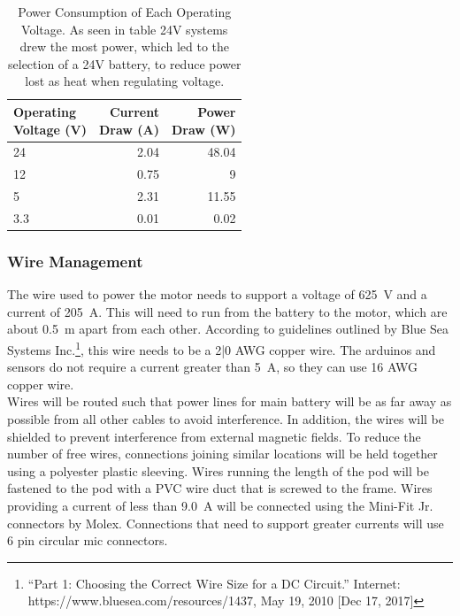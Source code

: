 \documentclass[main.tex]{subfiles}
\begin{document}
 \begin{table}[H]
        \centering
        \begin{tabular}{@{}lrr@{}} \toprule
            \makecell{Operating \\ Voltage (V)} & \makecell{Current \\ Draw (A)}  &  \makecell{Power \\ Draw (W)} \\ \midrule
            24 & 2.04 & 48.04\\
            12 & 0.75 & 9 \\
            5 & 2.31 & 11.55 \\
            3.3 & 0.01 & 0.02 \\ \bottomrule
        \end{tabular}
        \caption{Power Consumption of Each Operating Voltage. As seen in table 24V systems drew the most power, which led to the selection of a 24V battery, to reduce power lost as heat when regulating voltage.}
    \end{table}
    \subsubsection{Wire Management}
    The wire used to power the motor needs to support a voltage of \SI{625}{V} and a current of \SI{205}{A}. This will need to run from the battery to the motor, which are about \SI{0.5}{m} apart from each other. According to guidelines outlined by Blue Sea Systems Inc.\footnote{“Part 1: Choosing the Correct Wire Size for a DC Circuit.” Internet: https://www.bluesea.com/resources/1437, May 19, 2010 [Dec 17, 2017]}, this wire needs to be a 2|0 AWG copper wire. The arduinos and sensors do not require a current greater than \SI{5}{A}, so they can use 16 AWG copper wire.\\

    Wires will be routed such that power lines for main battery will be as far away as possible from all other cables to avoid interference. In addition, the wires will be shielded to prevent interference from external magnetic fields. To reduce the number of free wires, connections joining similar locations will be held together using a polyester plastic sleeving. Wires running the length of the pod will be fastened to the pod with a PVC wire duct that is screwed to the frame. Wires providing a current of less than \SI{9.0}{A} will be connected using the Mini-Fit Jr. connectors by Molex.  Connections that need to support greater currents will use 6 pin circular mic connectors.
\end{document}
